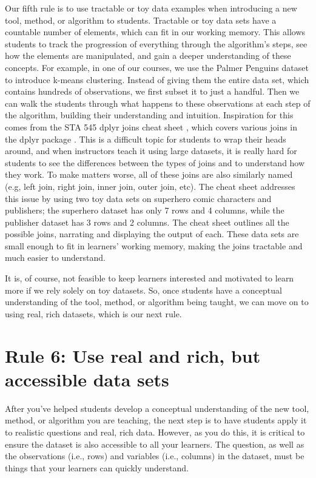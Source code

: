 \documentclass[
  10pt,
  letterpaper,
]{article}
\begin{document}
Our fifth rule is to use tractable or toy data examples when introducing
a new tool, method, or algorithm to students. Tractable or toy data sets
have a countable number of elements, which can fit in our working
memory. This allows students to track the progression of everything
through the algorithm's steps, see how the elements are manipulated, and
gain a deeper understanding of these concepts. For example, in one of
our courses, we use the Palmer Penguins dataset
\citep{horst2020palmerpenguins} to introduce k-means clustering. Instead
of giving them the entire data set, which contains hundreds of
observations, we first subset it to just a handful. Then we can walk the
students through what happens to these observations at each step of the
algorithm, building their understanding and intuition. Inspiration for
this comes from the STA 545 dplyr joins cheat sheet
\citep{bryan2015stat545}, which covers various joins in the dplyr
package \citep{dplyr}. This is a difficult topic for students to wrap
their heads around, and when instructors teach it using large datasets,
it is really hard for students to see the differences between the types
of joins and to understand how they work. To make matters worse, all of
these joins are also similarly named (e.g, left join, right join, inner
join, outer join, etc). The cheat sheet addresses this issue by using
two toy data sets on superhero comic characters and publishers; the
superhero dataset has only 7 rows and 4 columns, while the publisher
dataset has 3 rows and 2 columns. The cheat sheet outlines all the
possible joins, narrating and displaying the output of each. These data
sets are small enough to fit in learners' working memory, making the
joins tractable and much easier to understand.

It is, of course, not feasible to keep learners interested and motivated
to learn more if we rely solely on toy datasets. So, once students have
a conceptual understanding of the tool, method, or algorithm being
taught, we can move on to using real, rich datasets, which is our next
rule.

\section{Rule 6: Use real and rich, but accessible data
sets}\label{sec-rule6}

After you've helped students develop a conceptual understanding of the
new tool, method, or algorithm you are teaching, the next step is to
have students apply it to realistic questions and real, rich data.
However, as you do this, it is critical to ensure the dataset is also
accessible to all your learners. The question, as well as the
observations (i.e., rows) and variables (i.e., columns) in the dataset,
must be things that your learners can quickly understand.
\end{document}
